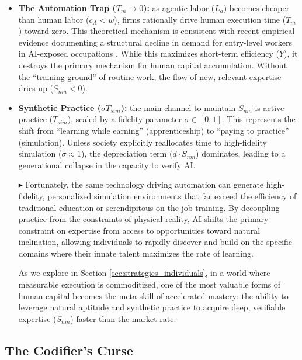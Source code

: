 \documentclass[12pt, letter]{article}
\begin{document}
\begin{itemize}
    \item \textbf{The Automation Trap ($T_m \to 0$):} as agentic labor ($L_a$) becomes cheaper than human labor ($c_A < w$), firms rationally drive human execution time ($T_m$) toward zero. This theoretical mechanism is consistent with recent empirical evidence documenting a structural decline in demand for entry-level workers in AI-exposed occupations \citep{Brynjolfsson2025}. While this maximizes short-term efficiency ($Y$), it destroys the primary mechanism for human capital accumulation. Without the ``training ground'' of routine work, the flow of new, relevant expertise dries up ($\dot{S}_{nm} < 0$).
       
    \item \textbf{Synthetic Practice ($\sigma T_{sim}$):} the main channel to maintain $S_{nm}$ is active practice ($T_{sim}$), scaled by a fidelity parameter $\sigma \in [0,1]$. This represents the shift from ``learning while earning'' (apprenticeship) to ``paying to practice'' (simulation). Unless society explicitly reallocates time to high-fidelity simulation ($\sigma \approx 1$), the depreciation term ($d \cdot S_{nm}$) dominates, leading to a generational collapse in the capacity to verify AI.

    $\blacktriangleright$ Fortunately, the same technology driving automation can generate high-fidelity, personalized simulation environments that far exceed the efficiency of traditional education or serendipitous on-the-job training. By decoupling practice from the constraints of physical reality, AI shifts the primary constraint on expertise from access to opportunities toward natural inclination, allowing individuals to rapidly discover and build on the specific domains where their innate talent maximizes the rate of learning.
    
    As we explore in Section \ref{sec:strategies_individuals}, in a world where measurable execution is commoditized, one of the most valuable forms of human capital becomes the meta-skill of accelerated mastery: the ability to leverage natural aptitude and synthetic practice to acquire deep, verifiable expertise ($S_{nm}$) faster than the market rate.
   
\end{itemize}



\subsection{The Codifier's Curse}\label{sec:codifiers_curse}
\end{document}
